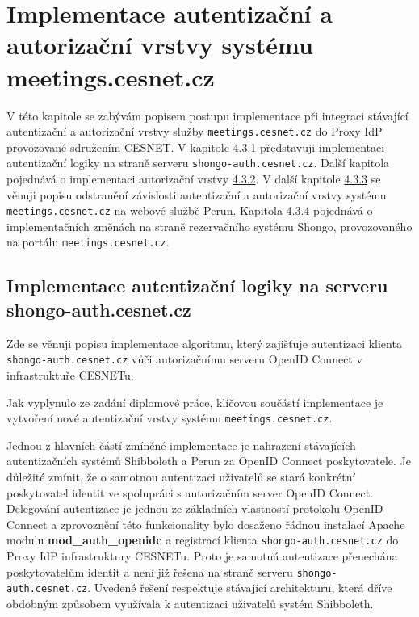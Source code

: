 \documentclass[
  printed, %
  twoside, %
  table,   %
  nolof,     %
  nolot,     %
]{fithesis3}
\begin{document}
\section{Implementace autentizační a autorizační vrstvy systému meetings.cesnet.cz}
\label{ShongoImpl}
V této kapitole se zabývám popisem postupu implementace při integraci stávající autentizační a autorizační vrstvy služby \texttt{meetings.cesnet.cz} do Proxy IdP provozované sdružením CESNET. V kapitole \hyperref[ShongoImpl-authn]{4.3.1} představuji implementaci autentizační logiky na straně serveru \texttt{shongo-auth.cesnet.cz}. Další kapitola pojednává o implementaci autorizační vrstvy \hyperref[ShongoImpl-authr]{4.3.2}. V další kapitole \hyperref[zpracovaniAUlozeniPerun]{4.3.3} se věnuji popisu odstranění závislosti autentizační a autorizační vrstvy systému \texttt{meetings.cesnet.cz} na webové službě Perun. Kapitola \hyperref[ShongoImpl-web]{4.3.4} pojednává o implementačních změnách na straně rezervačního systému Shongo, provozovaného na portálu \texttt{meetings.cesnet.cz}. 

\subsection{Implementace autentizační logiky na serveru shongo-auth.cesnet.cz}
\label{ShongoImpl-authn}    

Zde se věnuji popisu implementace algoritmu, který zajišťuje autentizaci klienta \texttt{shongo-auth.cesnet.cz} vůči autorizačnímu serveru OpenID Connect v infrastruktuře CESNETu.  

\par

Jak vyplynulo ze zadání diplomové práce, klíčovou součástí implementace je vytvoření nové autentizační vrstvy systému \texttt{meetings.cesnet.cz}.
\par

Jednou z hlavních částí zmíněné implementace je nahrazení stávajících autentizačních systémů Shibboleth a Perun za OpenID Connect poskytovatele.
Je důležité zmínit, že o samotnou autentizaci uživatelů se stará konkrétní poskytovatel identit ve spolupráci s autorizačním server OpenID Connect. Delegování autentizace je jednou ze základních vlastností protokolu OpenID Connect a zprovoznění této funkcionality bylo dosaženo řádnou instalací Apache modulu \textbf{mod\_auth\_openidc} a registrací klienta \texttt{shongo-auth.cesnet.cz} do Proxy IdP infrastruktury CESNETu. Proto je samotná autentizace přenechána poskytovatelům identit a není již řešena na straně serveru \texttt{shongo-auth.cesnet.cz}. Uvedené řešení respektuje stávající architekturu, která dříve obdobným způsobem využívala k autentizaci uživatelů systém Shibboleth. 
\end{document}
